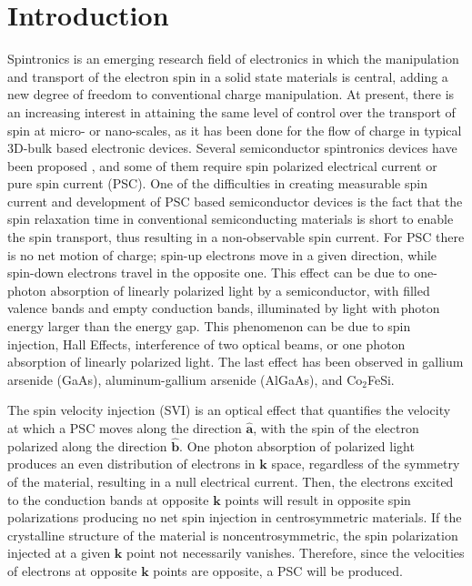\documentclass[floatfix,prb,aps,superscriptaddress,showpacs,11pt,preprint,letterpaper]{revtex4}
\begin{document}
\section{Introduction}
\label{sec:introduction}

Spintronics is an emerging research field of electronics in which the
manipulation and transport of the electron spin in a solid state materials  is
central, adding a new degree of freedom to conventional charge
manipulation.\cite{wolfSC04,fabianAPS07} At present, there is an increasing
interest in attaining the same level of control over the transport of spin at
micro- or nano-scales, as it has been done for the flow of charge in typical
3D-bulk based electronic devices.\cite{awschalomNP2007} Several semiconductor
spintronics devices have been proposed \cite{majumdarAPL06,
dattaAPL90,gotteNat16,pershinPRB08}, and some of them require spin polarized
electrical current \cite{awschalomSSBM13} or pure spin current (PSC). One of
the difficulties in creating measurable  spin current and
development of PSC based semiconductor devices is the fact that the spin
relaxation time in conventional semiconducting materials is short to enable the
spin transport, thus resulting in a non-observable spin
current.\cite{murakamiSc03} For PSC there is no net motion of charge; spin-up
electrons move in a given direction, while spin-down electrons travel in the
opposite one. This effect can be due to one-photon absorption of linearly
polarized light by a semiconductor, with filled valence bands and empty
conduction bands, illuminated by light with photon energy larger than the
energy gap. This phenomenon can be due to spin injection,\cite{malPRB03} Hall
Effects,\cite{sinovaPRB04} interference of two optical beams,\cite{bhatPRL00,
najmaiePRB03} or one photon absorption of linearly polarized
light\cite{bhatPRL05}. The last effect has been observed in gallium arsenide
(GaAs),\cite{zhaoPRL2006, stevensPRL03} aluminum-gallium arsenide
(AlGaAs),\cite{stevensPRL03} and Co$_2$FeSi.\cite{kimuraNGPAM12}

The spin velocity injection (SVI) is an optical effect that quantifies the velocity at which
a PSC moves along the direction $\hat{\mathbf{a}}$, 
with the spin of the electron polarized along the direction $\hat{\mathbf{b}}$.
One photon absorption of polarized
light produces an even distribution of electrons in $\mathbf{k}$
space, regardless of the symmetry of the material, resulting in a null
electrical current.\cite{bhatPRL05} 
Then, the electrons excited to the
conduction bands at opposite $\mathbf{k}$ points will result in opposite spin
polarizations producing no net spin injection in centrosymmetric 
materials.\cite{bhatPRL05} 
If the crystalline structure of the material
is noncentrosymmetric, the spin polarization injected at a given $\mathbf{k}$
point not necessarily vanishes.\cite{alvaradoPRL85,schmiedeskampPRL88}
Therefore, since the velocities of electrons at opposite $\mathbf{k}$ points
are opposite, a PSC will be produced. 
\end{document}
